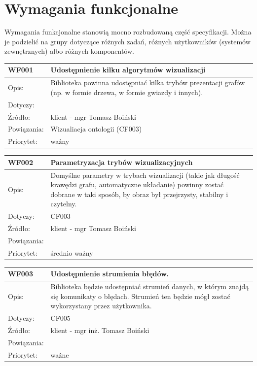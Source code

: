 \documentclass[a4paper,10pt]{article}
\begin{document}
\section{Wymagania funkcjonalne}

Wymagania funkcjonalne stanowią mocno rozbudowaną część specyfikacji. Można je podzielić na grupy dotyczące różnych zadań, różnych użytkowników (systemów zewnętrznych) albo różnych komponentów.


\begin{tabular}{|p{3cm}|p{9cm}|} \hline

WF001 & Udostępnienie kilku algorytmów wizualizacji \\ \hline
Opis: & Biblioteka powinna udostępniać kilka trybów prezentacji grafów (np. w formie drzewa, w formie gwiazdy i innych).    \\ \hline
Dotyczy: &  \\ \hline
Źródło: & klient - mgr Tomasz Boiński \\ \hline
Powiązania: & Wizualiacja ontologii (CF003)\\ \hline
Priorytet: &  ważny\\ \hline

\end{tabular}


\begin{tabular}{|p{3cm}|p{9cm}|} \hline

WF002 & Parametryzacja trybów wizualizacyjnych \\ \hline
Opis: & Domyślne parametry w trybach wizualizacji (takie jak długość krawędzi grafu, automatyczne układanie) powinny zostać dobrane w taki sposób, by obraz był przejrzysty, stabilny i czytelny.    \\ \hline
Dotyczy: & CF003 \\ \hline
Źródło: &  klient - mgr Tomasz Boiński\\ \hline
Powiązania: &  \\ \hline
Priorytet: & średnio ważny \\ \hline

\end{tabular}

\begin{tabular}{|p{3cm}|p{9cm}|} \hline

WF003 & Udostępnienie strumienia błędów. \\ \hline
Opis: &   Biblioteka będzie udostępniać strumień danych, w którym znajdą się komunikaty o błędach. Strumień ten będzie mógł zostać wykorzystany przez użytkownika. \\ \hline
Dotyczy: &  CF005  \\ \hline
Źródło: & klient - mgr inż. Tomasz Boiński \\ \hline
Powiązania: & \\ \hline
Priorytet: & ważne \\ \hline

\end{tabular}
\end{document}

